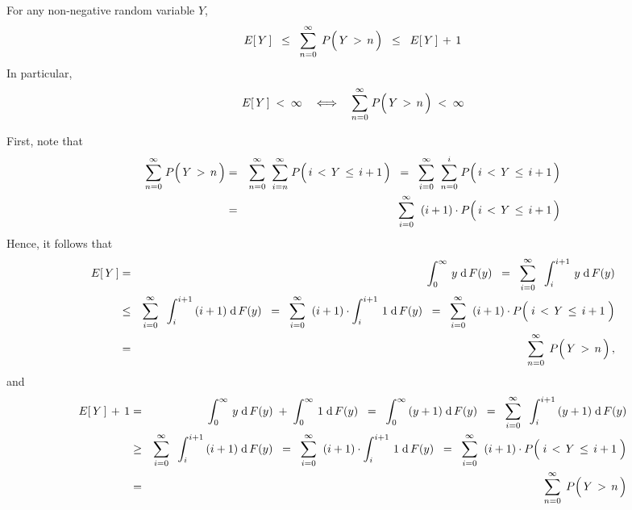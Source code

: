 \vskip 1.0cm
\begin{lemma}\label{lemma:EYIsFiniteIFFSumPYGTnIsFinite}
\mbox{}
\vskip 0.1cm
\noindent
For any non-negative random variable $Y$,
\begin{equation*}
E\!\left[\,Y\,\right]
\;\; \leq \;\;
	\overset{\infty}{\underset{n = 0}{\sum}}\;\,P\!\left(\, \overset{{\color{white}.}}{Y} \,>\, n \,\right)
\;\; \leq \;\;
	E\!\left[\,Y\,\right] \,+\, 1
\end{equation*}
In particular,
\begin{equation*}
E\!\left[\,Y\,\right] \; < \; \infty
\quad \Longleftrightarrow \quad
	\overset{\infty}{\underset{n = 0}{\sum}}\;P\!\left(\, \overset{{\color{white}.}}{Y} \,>\, n \,\right) \; < \; \infty
\end{equation*}
\end{lemma}
\proof
First, note that
\begin{eqnarray*}
\overset{\infty}{\underset{n = 0}{\sum}}\;P\!\left(\, \overset{{\color{white}.}}{Y} \,>\, n \,\right)
& = &
	\overset{\infty}{\underset{n = 0}{\sum}}\;\;
	\overset{\infty}{\underset{i = n}{\sum}}\;
	P\!\left(\, i \,<\, \overset{{\color{white}.}}{Y} \,\leq\, i+1 \,\right)
\;\; = \;\;
	\overset{\infty}{\underset{i = 0}{\sum}}\;\;
	\overset{i}{\underset{n = 0}{\sum}}\;
	P\!\left(\, i \,<\, \overset{{\color{white}.}}{Y} \,\leq\, i+1 \,\right)
\\
& = &
	\overset{\infty}{\underset{i = 0}{\sum}}\;\;
	(i+1) \cdot P\!\left(\, i \,<\, \overset{{\color{white}.}}{Y} \,\leq\, i+1 \,\right)
\end{eqnarray*}
Hence, it follows that
\begin{eqnarray*}
E\!\left[\,Y\,\right]
&=&
	\int_{0}^{\infty}\, y \;\d\,F(y)
	\;\; = \;\;
		\overset{\infty}{\underset{i = 0}{\sum}}\;\;
		\int_{i}^{i+1}\, y \;\d\,F(y)
\\
& \leq &
		\overset{\infty}{\underset{i = 0}{\sum}}\;\;
		\int_{i}^{i+1}\, (i+1) \;\d\,F(y)
	\;\; = \;\;
		\overset{\infty}{\underset{i = 0}{\sum}}\;\;
		(i+1) \cdot \int_{i}^{i+1}\, 1 \;\d\,F(y)
	\;\; = \;\;
		\overset{\infty}{\underset{i = 0}{\sum}}\;\;
		(i+1) \cdot P\!\left(\; i \,<\, \overset{{\color{white}.}}{Y} \,\leq\, i+1 \;\right)
\\
& = &
	\overset{\infty}{\underset{n = 0}{\sum}}\;\,
	P\!\left(\, \overset{{\color{white}.}}{Y} \,>\, n \,\right),
\end{eqnarray*}
and
\begin{eqnarray*}
E\!\left[\,Y\,\right] \,+\, 1
&=&
	\int_{0}^{\infty}\, y \;\d\,F(y)
		\; + \;
		\int_{0}^{\infty}\, 1 \;\d\,F(y)
	\;\; = \;\;
		\int_{0}^{\infty}\, (y+1) \;\d\,F(y)
	\;\; = \;\;
		\overset{\infty}{\underset{i = 0}{\sum}}\;\;
		\int_{i}^{i+1}\, (y+1) \;\d\,F(y)
\\
& \geq &
		\overset{\infty}{\underset{i = 0}{\sum}}\;\;
		\int_{i}^{i+1}\, (i+1) \;\d\,F(y)
	\;\; = \;\;
		\overset{\infty}{\underset{i = 0}{\sum}}\;\;
		(i+1) \cdot \int_{i}^{i+1}\, 1 \;\d\,F(y)
	\;\; = \;\;
		\overset{\infty}{\underset{i = 0}{\sum}}\;\;
		(i+1) \cdot P\!\left(\; i \,<\, \overset{{\color{white}.}}{Y} \,\leq\, i+1 \;\right)
\\
& = &
	\overset{\infty}{\underset{n = 0}{\sum}}\;\,
	P\!\left(\, \overset{{\color{white}.}}{Y} \,>\, n \,\right)
\end{eqnarray*}
